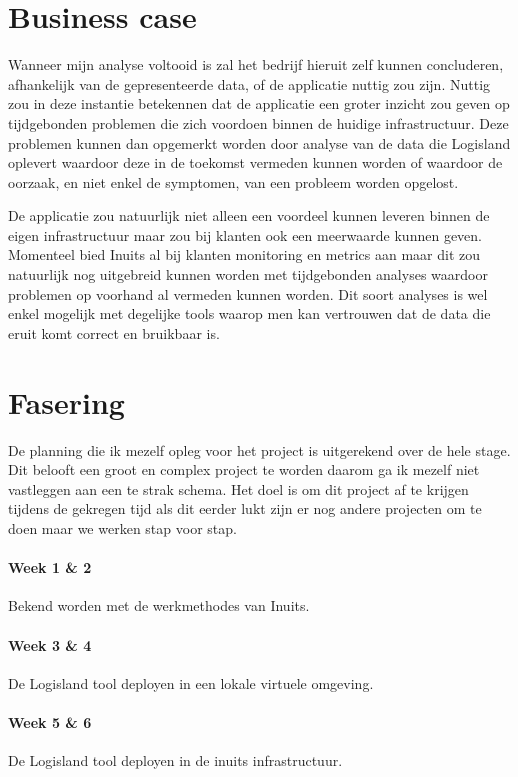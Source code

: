 \documentclass[a4paper]{article}
\begin{document}
\section{Business case}
Wanneer mijn analyse voltooid is zal het bedrijf hieruit zelf kunnen concluderen, afhankelijk van de gepresenteerde data, of de applicatie nuttig zou zijn. 
Nuttig zou in deze instantie betekennen dat de applicatie een groter inzicht zou geven op tijdgebonden problemen die zich voordoen binnen de huidige infrastructuur.
Deze problemen kunnen dan opgemerkt worden door analyse van de data die Logisland oplevert waardoor deze in de toekomst vermeden kunnen worden of waardoor de oorzaak, en niet enkel de symptomen, van een probleem worden opgelost.
\par
De applicatie zou natuurlijk niet alleen een voordeel kunnen leveren binnen de eigen infrastructuur maar zou bij klanten ook een meerwaarde kunnen geven. 
Momenteel bied Inuits al bij klanten monitoring en metrics aan maar dit zou natuurlijk nog uitgebreid kunnen worden met tijdgebonden analyses waardoor problemen op voorhand al vermeden kunnen worden.
Dit soort analyses is wel enkel mogelijk met degelijke tools waarop men kan vertrouwen dat de data die eruit komt correct en bruikbaar is.

\newpage{}
\section{Fasering}
De planning die ik mezelf opleg voor het project is uitgerekend over de hele stage.
Dit belooft een groot en complex project te worden daarom ga ik mezelf niet vastleggen aan een te strak schema.
Het doel is om dit project af te krijgen tijdens de gekregen tijd als dit eerder lukt zijn er nog andere projecten om te doen maar we werken stap voor stap.
\par
\paragraph{Week 1 \& 2} Bekend worden met de werkmethodes van Inuits.
\paragraph{Week 3 \& 4} De Logisland tool deployen in een lokale virtuele omgeving.
\paragraph{Week 5 \& 6} De Logisland tool deployen in de inuits infrastructuur.
\end{document}
